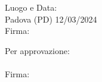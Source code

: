 \begin{samepage}

    \vspace*{\fill}
    Luogo e Data: \\
    Padova (PD) 12/03/2024 \\

    \vspace{5px}
    Firma: \hrulefill \\

    Per approvazione: \\
    \vspace{5px} \\
    Firma: \hrulefill \\

    \vspace{5px}

\end{samepage}
